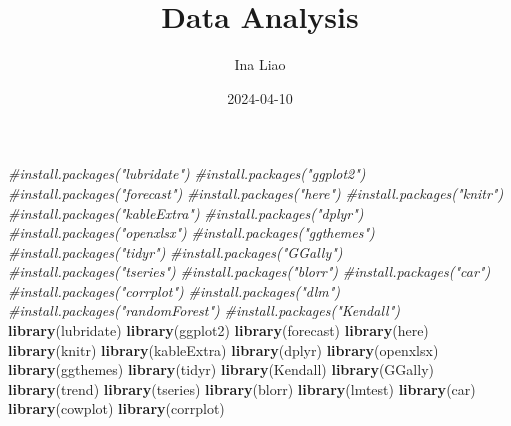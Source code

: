 \documentclass[
]{article}
\title{Data Analysis}
\author{Ina Liao}
\date{2024-04-10}
\newenvironment{Shaded}{\begin{snugshade}}{\end{snugshade}}
\newcommand{\CommentTok}[1]{\textcolor[rgb]{0.56,0.35,0.01}{\textit{#1}}}
\newcommand{\FunctionTok}[1]{\textcolor[rgb]{0.13,0.29,0.53}{\textbf{#1}}}
\newcommand{\NormalTok}[1]{#1}
\begin{document}
\maketitle

\begin{Shaded}
\begin{Highlighting}[]
\CommentTok{\#install.packages("lubridate")}
\CommentTok{\#install.packages("ggplot2")}
\CommentTok{\#install.packages("forecast")}
\CommentTok{\#install.packages("here")}
\CommentTok{\#install.packages("knitr")}
\CommentTok{\#install.packages("kableExtra")}
\CommentTok{\#install.packages("dplyr")}
\CommentTok{\#install.packages("openxlsx")}
\CommentTok{\#install.packages("ggthemes")}
\CommentTok{\#install.packages("tidyr")}
\CommentTok{\#install.packages("GGally")}
\CommentTok{\#install.packages("tseries")}
\CommentTok{\#install.packages("blorr")}
\CommentTok{\#install.packages("car")}
\CommentTok{\#install.packages("corrplot")}
\CommentTok{\#install.packages("dlm")}
\CommentTok{\#install.packages("randomForest")}
\CommentTok{\#install.packages("Kendall")}
\FunctionTok{library}\NormalTok{(lubridate)}
\FunctionTok{library}\NormalTok{(ggplot2)}
\FunctionTok{library}\NormalTok{(forecast) }
\FunctionTok{library}\NormalTok{(here)}
\FunctionTok{library}\NormalTok{(knitr)}
\FunctionTok{library}\NormalTok{(kableExtra)}
\FunctionTok{library}\NormalTok{(dplyr)}
\FunctionTok{library}\NormalTok{(openxlsx)}
\FunctionTok{library}\NormalTok{(ggthemes)}
\FunctionTok{library}\NormalTok{(tidyr)}
\FunctionTok{library}\NormalTok{(Kendall)}
\FunctionTok{library}\NormalTok{(GGally)}
\FunctionTok{library}\NormalTok{(trend)}
\FunctionTok{library}\NormalTok{(tseries)}
\FunctionTok{library}\NormalTok{(blorr)   }
\FunctionTok{library}\NormalTok{(lmtest) }
\FunctionTok{library}\NormalTok{(car)}
\FunctionTok{library}\NormalTok{(cowplot)}
\FunctionTok{library}\NormalTok{(corrplot)}
\end{Highlighting}
\end{Shaded}
\end{document}
